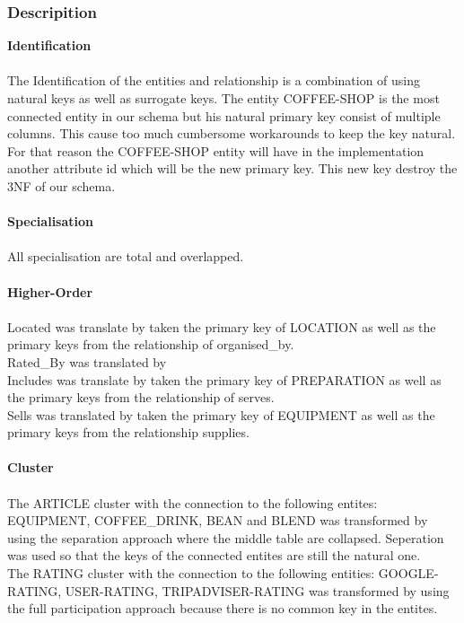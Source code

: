 \subsubsection{Descripition}
\textbf{Identification}\\\\
The Identification of the entities and relationship is a combination of using natural keys as well as surrogate keys. 
The entity COFFEE-SHOP is the most connected entity in our schema but his natural primary key consist of multiple columns. This cause too much cumbersome workarounds to keep the key natural. For that reason the COFFEE-SHOP entity will have in the implementation another attribute id which will be the new primary key. This new key destroy the 3NF of our schema.\\\\
\textbf{Specialisation}\\\\
All specialisation are total and overlapped. \\\\
\textbf{Higher-Order}\\\\
Located was translate by taken the primary key  of LOCATION as well as the primary keys from the relationship of organised\_by.\\
Rated\_By was translated by\\
Includes was translate by taken the primary key of PREPARATION as well as the primary keys from the relationship of serves.\\
Sells was translated by taken the primary key of EQUIPMENT as well as the primary keys from the relationship supplies.\\\\ 
\textbf{Cluster}\\\\
The ARTICLE cluster with the connection to the following entites: EQUIPMENT, COFFEE\_DRINK, BEAN and BLEND was transformed by using the separation approach where the middle table are collapsed. Seperation was used so that the keys of the connected entites are still the natural one. \\
The RATING cluster with the connection to the following entities: GOOGLE-RATING, USER-RATING, TRIPADVISER-RATING was transformed by using the full participation approach because there is no common key in the entites.\\\\
